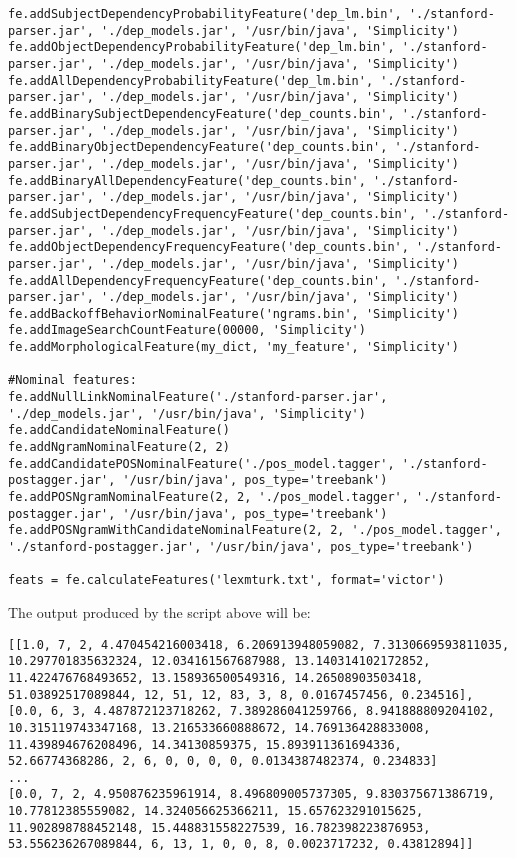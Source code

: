 \begin{lstlisting}
fe.addSubjectDependencyProbabilityFeature('dep_lm.bin', './stanford-parser.jar', './dep_models.jar', '/usr/bin/java', 'Simplicity')
fe.addObjectDependencyProbabilityFeature('dep_lm.bin', './stanford-parser.jar', './dep_models.jar', '/usr/bin/java', 'Simplicity')
fe.addAllDependencyProbabilityFeature('dep_lm.bin', './stanford-parser.jar', './dep_models.jar', '/usr/bin/java', 'Simplicity')
fe.addBinarySubjectDependencyFeature('dep_counts.bin', './stanford-parser.jar', './dep_models.jar', '/usr/bin/java', 'Simplicity')
fe.addBinaryObjectDependencyFeature('dep_counts.bin', './stanford-parser.jar', './dep_models.jar', '/usr/bin/java', 'Simplicity')
fe.addBinaryAllDependencyFeature('dep_counts.bin', './stanford-parser.jar', './dep_models.jar', '/usr/bin/java', 'Simplicity')
fe.addSubjectDependencyFrequencyFeature('dep_counts.bin', './stanford-parser.jar', './dep_models.jar', '/usr/bin/java', 'Simplicity')
fe.addObjectDependencyFrequencyFeature('dep_counts.bin', './stanford-parser.jar', './dep_models.jar', '/usr/bin/java', 'Simplicity')
fe.addAllDependencyFrequencyFeature('dep_counts.bin', './stanford-parser.jar', './dep_models.jar', '/usr/bin/java', 'Simplicity')
fe.addBackoffBehaviorNominalFeature('ngrams.bin', 'Simplicity')
fe.addImageSearchCountFeature(00000, 'Simplicity')
fe.addMorphologicalFeature(my_dict, 'my_feature', 'Simplicity')

#Nominal features:
fe.addNullLinkNominalFeature('./stanford-parser.jar', './dep_models.jar', '/usr/bin/java', 'Simplicity')
fe.addCandidateNominalFeature()
fe.addNgramNominalFeature(2, 2)
fe.addCandidatePOSNominalFeature('./pos_model.tagger', './stanford-postagger.jar', '/usr/bin/java', pos_type='treebank')
fe.addPOSNgramNominalFeature(2, 2, './pos_model.tagger', './stanford-postagger.jar', '/usr/bin/java', pos_type='treebank')
fe.addPOSNgramWithCandidateNominalFeature(2, 2, './pos_model.tagger', './stanford-postagger.jar', '/usr/bin/java', pos_type='treebank')

feats = fe.calculateFeatures('lexmturk.txt', format='victor')
\end{lstlisting}

The output produced by the script above will be:

\begin{lstlisting}
[[1.0, 7, 2, 4.470454216003418, 6.206913948059082, 7.3130669593811035, 10.297701835632324, 12.034161567687988, 13.140314102172852, 11.422476768493652, 13.158936500549316, 14.26508903503418, 51.03892517089844, 12, 51, 12, 83, 3, 8, 0.0167457456, 0.234516], [0.0, 6, 3, 4.487872123718262, 7.389286041259766, 8.941888809204102, 10.315119743347168, 13.216533660888672, 14.769136428833008, 11.439894676208496, 14.34130859375, 15.893911361694336, 52.66774368286, 2, 6, 0, 0, 0, 0, 0.0134387482374, 0.234833]
...
[0.0, 7, 2, 4.950876235961914, 8.496809005737305, 9.830375671386719, 10.77812385559082, 14.324056625366211, 15.657623291015625, 11.902898788452148, 15.448831558227539, 16.782398223876953, 53.556236267089844, 6, 13, 1, 0, 0, 8, 0.0023717232, 0.43812894]]
\end{lstlisting}

